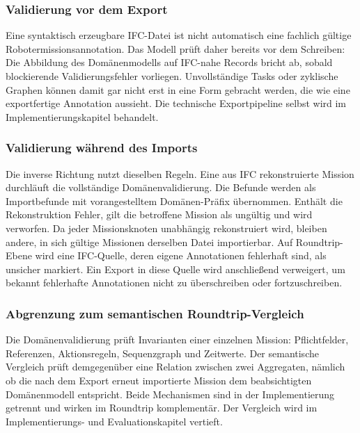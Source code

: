 \subsubsection{Validierung vor dem Export}
Eine syntaktisch erzeugbare IFC-Datei ist nicht automatisch eine fachlich gültige
Robotermissionsannotation. Das Modell prüft daher bereits vor dem Schreiben: Die Abbildung des
Domänenmodells auf IFC-nahe Records bricht ab, sobald blockierende Validierungsfehler vorliegen.
Unvollständige Tasks oder zyklische Graphen können damit gar nicht erst in eine Form gebracht
werden, die wie eine exportfertige Annotation aussieht. Die technische Exportpipeline selbst wird im
Implementierungskapitel behandelt.

\subsubsection{Validierung während des  Imports}
Die inverse Richtung nutzt dieselben Regeln. Eine aus IFC rekonstruierte Mission durchläuft die
vollständige Domänenvalidierung. Die Befunde werden als Importbefunde mit vorangestelltem
Domänen-Präfix übernommen. Enthält die Rekonstruktion Fehler, gilt die betroffene Mission als
ungültig und wird verworfen. Da jeder Missionsknoten unabhängig rekonstruiert wird, bleiben andere,
in sich gültige Missionen derselben Datei importierbar. Auf Roundtrip-Ebene wird eine IFC-Quelle,
deren eigene Annotationen fehlerhaft sind, als unsicher markiert. Ein Export in diese Quelle wird
anschließend verweigert, um bekannt fehlerhafte Annotationen nicht zu überschreiben oder
fortzuschreiben.

\subsubsection{Abgrenzung zum semantischen Roundtrip-Vergleich}
Die Domänenvalidierung prüft Invarianten einer einzelnen Mission: Pflichtfelder, Referenzen,
Aktionsregeln, Sequenzgraph und Zeitwerte. Der semantische Vergleich prüft demgegenüber eine
Relation zwischen zwei Aggregaten, nämlich ob die nach dem Export erneut importierte Mission dem
beabsichtigten Domänenmodell entspricht. Beide Mechanismen sind in der Implementierung getrennt und
wirken im Roundtrip komplementär. Der Vergleich wird im Implementierungs- und Evaluationskapitel
vertieft.
